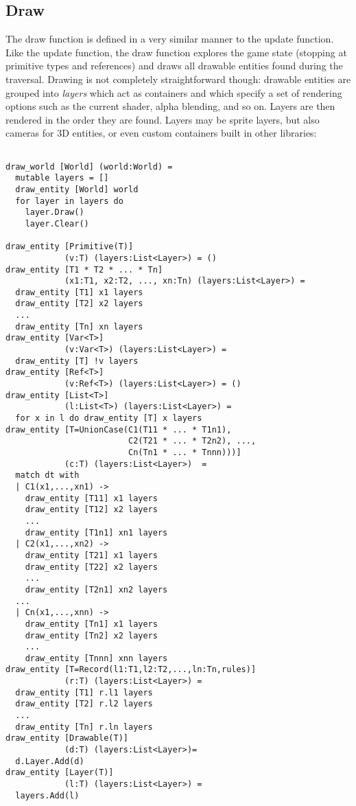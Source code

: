 \subsection{Draw}
The draw function is defined in a very similar manner to the update function. Like the update function, the draw function explores the game state (stopping at primitive types and references) and draws all drawable entities found during the traversal. Drawing is not completely straightforward though: drawable entities are grouped into \textit{layers} which act as containers and which specify a set of rendering options such as the current shader, alpha blending, and so on. Layers are then rendered in the order they are found. Layers may be sprite layers, but also cameras for 3D entities, or even custom containers built in other libraries:

\begin{lstlisting}

draw_world [World] (world:World) = 
  mutable layers = []
  draw_entity [World] world
  for layer in layers do
    layer.Draw()
    layer.Clear()

draw_entity [Primitive(T)] 
            (v:T) (layers:List<Layer>) = ()
draw_entity [T1 * T2 * ... * Tn] 
            (x1:T1, x2:T2, ..., xn:Tn) (layers:List<Layer>) =
  draw_entity [T1] x1 layers
  draw_entity [T2] x2 layers
  ...
  draw_entity [Tn] xn layers
draw_entity [Var<T>] 
            (v:Var<T>) (layers:List<Layer>) = 
  draw_entity [T] !v layers
draw_entity [Ref<T>] 
            (v:Ref<T>) (layers:List<Layer>) = ()
draw_entity [List<T>] 
            (l:List<T>) (layers:List<Layer>) =
  for x in l do draw_entity [T] x layers
draw_entity [T=UnionCase(C1(T11 * ... * T1n1), 
                         C2(T21 * ... * T2n2), ..., 
                         Cn(Tn1 * ... * Tnnn)))] 
            (c:T) (layers:List<Layer>)  =
  match dt with
  | C1(x1,...,xn1) ->
    draw_entity [T11] x1 layers
    draw_entity [T12] x2 layers
    ...
    draw_entity [T1n1] xn1 layers
  | C2(x1,...,xn2) ->
    draw_entity [T21] x1 layers
    draw_entity [T22] x2 layers
    ...
    draw_entity [T2n1] xn2 layers
  ...
  | Cn(x1,...,xnn) ->
    draw_entity [Tn1] x1 layers
    draw_entity [Tn2] x2 layers
    ...
    draw_entity [Tnnn] xnn layers
draw_entity [T=Record(l1:T1,l2:T2,...,ln:Tn,rules)] 
            (r:T) (layers:List<Layer>) =
  draw_entity [T1] r.l1 layers
  draw_entity [T2] r.l2 layers
  ...
  draw_entity [Tn] r.ln layers
draw_entity [Drawable(T)] 
            (d:T) (layers:List<Layer>)= 
  d.Layer.Add(d)
draw_entity [Layer(T)] 
            (l:T) (layers:List<Layer>) =
  layers.Add(l)
\end{lstlisting}

